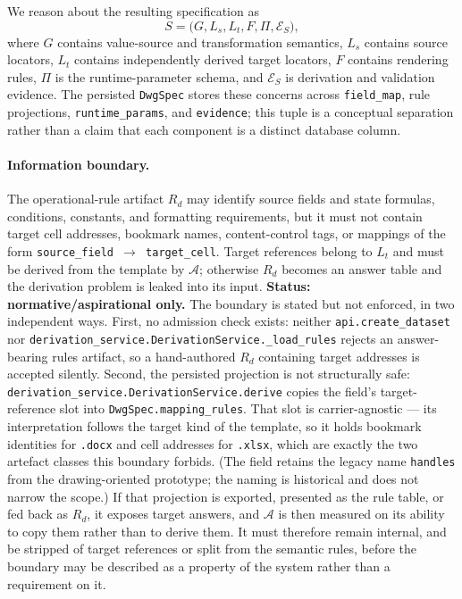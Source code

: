 We reason about the resulting specification as
\begin{equation}
S=\bigl(G,L_s,L_t,F,\Pi,\mathcal{E}_S\bigr),
\end{equation}
where $G$ contains value-source and transformation semantics, $L_s$ contains source
locators, $L_t$ contains independently derived target locators, $F$ contains rendering
rules, $\Pi$ is the runtime-parameter schema, and $\mathcal{E}_S$ is derivation and
validation evidence. The persisted \texttt{DwgSpec} stores these concerns across
\texttt{field\_map}, rule projections, \texttt{runtime\_params}, and
\texttt{evidence}; this tuple is a conceptual separation rather than a claim that each
component is a distinct database column.

\paragraph{Information boundary.}
The operational-rule artifact $R_d$ may identify source fields and state formulas,
conditions, constants, and formatting requirements, but it must not contain target cell
addresses, bookmark names, content-control tags, or mappings of the form
\texttt{source\_field $\rightarrow$ target\_cell}. Target references belong to $L_t$ and
must be derived from the template by $\mathcal{A}$; otherwise $R_d$ becomes an answer
table and the derivation problem is leaked into its input. \textbf{Status:
normative/aspirational only.} The boundary is stated but not enforced, in two
independent ways. First, no admission check exists: neither
\texttt{api.create\_dataset} nor
\texttt{derivation\_service.DerivationService.\_load\_rules} rejects an answer-bearing
rules artifact, so a hand-authored $R_d$ containing target addresses is accepted
silently. Second, the persisted projection is not structurally safe:
\texttt{derivation\_service.DerivationService.derive} copies the field's target-reference
slot into \texttt{DwgSpec.mapping\_rules}. That slot is carrier-agnostic --- its
interpretation follows the target kind of the template, so it holds bookmark identities
for \texttt{.docx} and cell addresses for \texttt{.xlsx}, which are exactly the two
artefact classes this boundary forbids. (The field retains the legacy name
\texttt{handles} from the drawing-oriented prototype; the naming is historical and does
not narrow the scope.) If that projection is exported, presented as the rule table, or
fed back as $R_d$, it exposes target answers, and $\mathcal{A}$ is then measured on its
ability to copy them rather than to derive them. It must therefore remain internal, and
be stripped of target references or split from the semantic rules, before the boundary
may be described as a property of the system rather than a requirement on it.

